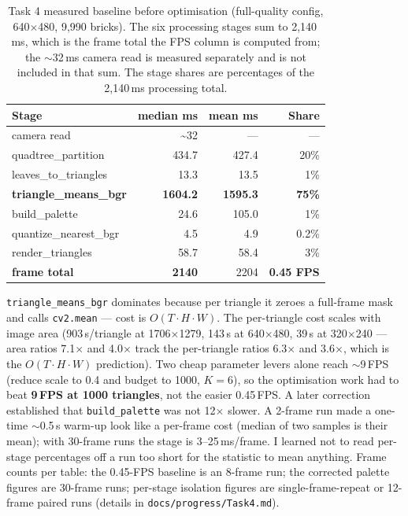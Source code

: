 \documentclass[11pt,a4paper]{article}
\begin{document}
\begin{table}[htbp]
\centering
\begin{tabular}{@{}l r r r@{}}
\toprule
\textbf{Stage} & \textbf{median ms} & \textbf{mean ms} & \textbf{Share}\\
\midrule
camera read                  & \textasciitilde32 & ---             & --- \\
quadtree\_partition          & 434.7 & 427.4 & 20\% \\
leaves\_to\_triangles        & 13.3  & 13.5  & 1\% \\
\textbf{triangle\_means\_bgr} & \textbf{1604.2} & \textbf{1595.3} & \textbf{75\%} \\
build\_palette               & 24.6  & 105.0 & 1\% \\
quantize\_nearest\_bgr       & 4.5   & 4.9   & 0.2\% \\
render\_triangles            & 58.7  & 58.4  & 3\% \\
\midrule
\textbf{frame total}         & \textbf{2140} & 2204 & \textbf{0.45 FPS} \\
\bottomrule
\end{tabular}
\caption{Task 4 measured baseline before optimisation (full-quality config,
640$\times$480, 9{,}990 bricks). The six processing stages sum to 2{,}140\,ms,
which is the frame total the FPS column is computed from; the $\sim$32\,ms
camera read is measured separately and is not included in that sum. The stage
shares are percentages of the 2{,}140\,ms processing total.}
\label{tab:baseline}
\end{table}

\texttt{triangle\_means\_bgr} dominates because per triangle it zeroes a
full-frame mask and calls \texttt{cv2.mean} --- cost is $O(T\cdot H\cdot W)$.
The per-triangle cost scales with image area (903\,\textmu s/triangle at
1706$\times$1279, 143\,\textmu s at 640$\times$480, 39\,\textmu s at
320$\times$240 --- area ratios 7.1$\times$ and 4.0$\times$ track the
per-triangle ratios 6.3$\times$ and 3.6$\times$, which is the
$O(T\cdot H\cdot W)$ prediction). Two cheap parameter levers alone reach
$\sim$9\,FPS (reduce scale to 0.4 and budget to 1000, $K=6$), so the optimisation
work had to beat \textbf{9\,FPS at 1000 triangles}, not the easier 0.45\,FPS. A
later correction established that \texttt{build\_palette} was not 12$\times$
slower. A 2-frame run made a one-time $\sim$0.5\,s warm-up look like a per-frame
cost (median of two samples is their mean); with 30-frame runs the stage is
3--25\,ms/frame. I learned not to read per-stage percentages off a run too short
for the statistic to mean anything. Frame counts per table: the 0.45-FPS
baseline is an 8-frame run; the corrected palette figures are 30-frame runs;
per-stage isolation figures are single-frame-repeat or 12-frame paired runs
(details in \texttt{docs/progress/Task4.md}).
\end{document}
